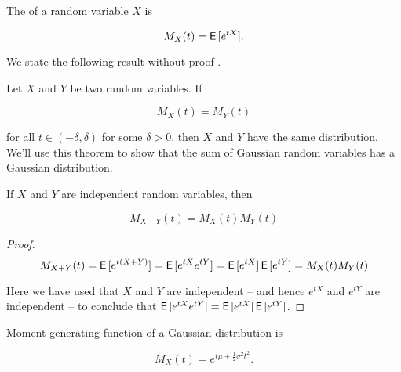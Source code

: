 \begin{defn}
    The  of a random variable $X$ is
    
    \begin{equation}
    M_X(t) = \operatorname{\textsf{E}\,}[e^{t X}].
    \end{equation}
\end{defn}

We state the following result without proof .

\begin{thm}
    Let $X$ and $Y$ be two random variables. If
    
    \begin{equation}
    M_X(t) = M_Y(t)
    \end{equation}
    
    for all $t \in (-\delta, \delta)$ for some $\delta > 0$, then $X$ and $Y$ have the same distribution. We'll use this theorem to show that the sum of Gaussian random variables has a Gaussian distribution.
\end{thm}

\begin{thm}
    \citep{mitzenmacher2017probability}\label{thm:sum-independent-gaussian}
    If $X$ and $Y$ are independent random variables, then
    
    \begin{equation}
    M_{X + Y}(t) = M_X(t) M_Y(t)
    \end{equation}
    
    \begin{proof}
        \begin{equation}
        M_{X + Y}(t) = \operatorname{\textsf{E}\,}[e^{t(X + Y)}] = \operatorname{\textsf{E}\,}[e^{tX} e^{tY}] = \operatorname{\textsf{E}\,}[e^{tX}] \operatorname{\textsf{E}\,}[e^{tY}] = M_X(t) M_Y(t)
        \end{equation}
        
        Here we have used that $X$ and $Y$ are independent -- and hence $e^{tX}$ and $e^{tY}$ are independent -- to conclude that $\operatorname{\textsf{E}\,}[e^{tX} e^{tY}] = \operatorname{\textsf{E}\,}[e^{tX}] \operatorname{\textsf{E}\,}[e^{tY}]$. 
    \end{proof}
\end{thm}


\begin{thm}
    Moment generating function of a Gaussian distribution is
    
    \begin{equation}
        M_X(t) = e^{t \mu + \frac{1}{2}\sigma^2 t^2}.
    \end{equation}
\end{thm}

